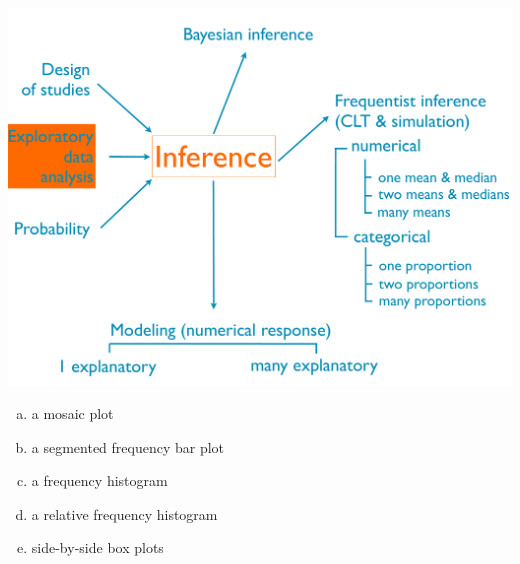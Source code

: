 \documentclass[slidestop,compress,mathserif,12pt,t,professionalfonts,xcolor=table]{beamer}
\newcommand{\solnMult}[1]{#1}
\begin{document}
\begin{frame}

{
{\scriptsize
{}}}
{
 \includegraphics[width=\textwidth]{figures/map/eda}
}

\vfill

{\footnotesize
\begin{enumerate}[(a)]
\item a mosaic plot
\item a segmented frequency bar plot
\item a frequency histogram
\item a relative frequency histogram
\item \solnMult{side-by-side box plots}
\end{enumerate}
}

\end{frame}

\end{document}
